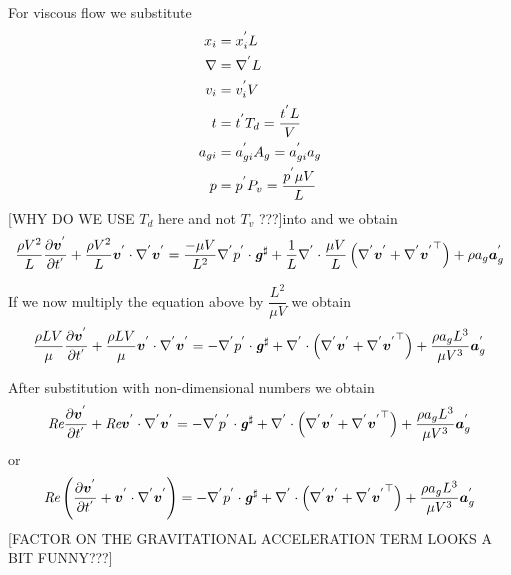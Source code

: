 For viscous flow we substitute
\begin{align}
  x_{i} &=  {x}^{'} _{i}L \\
   \nabla  &=   {\nabla}^{'}   L \\
  v_{i} &=  {v}^{'} _{i}V \\
  t &=  {t}^{'} T_{d}=\dfrac{ {t}^{'} L}{V}\\
  a_{gi} &=  {a}^{'} _{gi}A_{g}= {a}^{'} _{gi}a_{g}\\
  p &=  {p}^{'} P_{v}=\dfrac{ {p}^{'} \mu V}{L}
\end{align}
[WHY DO WE USE $T_{d}$ here and not $T_{v}$ ???]into
 and
 we obtain
\begin{equation}
  \dfrac{\rho V^{2}}{L}\delby{\nondim{\vectr{v}}}{\nondim{t}}
  +\dotprod{\dfrac{\rho V^{2}}{L}\nondim{\vectr{v}}}{\gradientnondim{}{\nondim{\vectr{v}}}}
  =\dotprod{\dfrac{-\mu V}{L^{2}}\gradientnondim{}{\nondim{p}}}{\sharptensor{\tensor{g}}}
  +\dfrac{1}{L}\divergencenondim{}{\dfrac{\mu V}{L}\pbrac{\gradientnondim{}{\nondim{\vectr{v}}+
        \transpose{\gradientnondim{}{\nondim{\vectr{v}}}}}}}
  +\rho a_{g}\nondim{\vectr{a}}_{g}
\end{equation}

If we now multiply the equation above by $\dfrac{L^{2}}{\mu V}$ we obtain
\begin{equation}
  \dfrac{\rho L V}{\mu}\delby{\nondim{\vectr{v}}}{\nondim{t}}+
  \dfrac{\rho L V}{\mu}\dotprod{\nondim{\vectr{v}}}{\gradientnondim{}{\nondim{\vectr{v}}}}
  =\dotprod{-\gradientnondim{}{\nondim{p}}}{\sharptensor{\tensor{g}}}
  +\divergencenondim{}{\pbrac{\gradientnondim{}{\nondim{\vectr{v}}+
        \transpose{\gradientnondim{}{\nondim{\vectr{v}}}}}}}
  +\dfrac{\rho a_{g}L^{3}}{\mu V^{3}}\nondim{\vectr{a}}_{g}
\end{equation}

After substitution with non-dimensional numbers we obtain
\begin{equation}
  \reynoldsnum\delby{\nondim{\vectr{v}}}{\nondim{t}}
  +\reynoldsnum\dotprod{\nondim{\vectr{v}}}{\gradientnondim{}{\nondim{\vectr{v}}}}
  =\dotprod{-\gradientnondim{}{\nondim{p}}}{\sharptensor{\tensor{g}}}+
  \divergencenondim{}{\pbrac{\gradientnondim{}{\nondim{\vectr{v}}+
        \transpose{\gradientnondim{}{\nondim{\vectr{v}}}}}}}
  +\dfrac{\rho a_{g}L^{3}}{\mu V^{3}}\nondim{\vectr{a}}_{g}
\end{equation}
or
\begin{equation}
  \reynoldsnum\pbrac{\delby{\nondim{\vectr{v}}}{\nondim{t}}
  +\dotprod{\nondim{\vectr{v}}}{\gradientnondim{}{\nondim{\vectr{v}}}}}
  =\dotprod{-\gradientnondim{}{\nondim{p}}}{\sharptensor{\tensor{g}}}+
  \divergencenondim{}{\pbrac{\gradientnondim{}{\nondim{\vectr{v}}+
        \transpose{\gradientnondim{}{\nondim{\vectr{v}}}}}}}
  +\dfrac{\rho a_{g}L^{3}}{\mu V^{3}}\nondim{\vectr{a}}_{g}
\end{equation}
    [FACTOR ON THE GRAVITATIONAL ACCELERATION TERM LOOKS A BIT FUNNY???]
    
